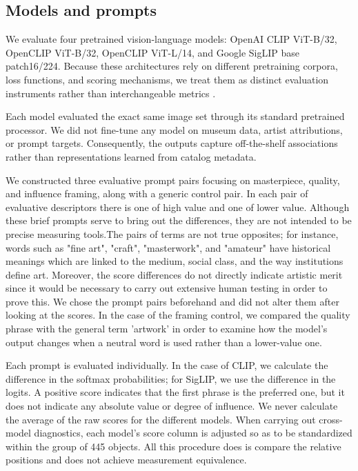 \documentclass[pdflatex,sn-basic,Numbered]{sn-jnl}
\begin{document}
\subsection{Models and prompts}

We evaluate four pretrained vision-language models: OpenAI CLIP ViT-B/32, OpenCLIP ViT-B/32, OpenCLIP ViT-L/14, and Google SigLIP base patch16/224. Because these architectures rely on different pretraining corpora, loss functions, and scoring mechanisms, we treat them as distinct evaluation instruments rather than interchangeable metrics \cite{radford2021learning, cherti2023reproducible, schuhmann2022laion, zhai2023sigmoid}.

Each model evaluated the exact same image set through its standard pretrained processor. We did not fine-tune any model on museum data, artist attributions, or prompt targets. Consequently, the outputs capture off-the-shelf associations rather than representations learned from catalog metadata.

We constructed three evaluative prompt pairs focusing on masterpiece, quality, and influence framing, along with a generic control pair.
In each pair of evaluative descriptors there is one of high value and one of lower value. Although these brief prompts serve to bring out the differences, they are not intended to be precise measuring tools.The pairs of terms are not true opposites; for instance, words such as "fine art", "craft", "masterwork", and "amateur" have historical meanings which are linked to the medium, social class, and the way institutions define art. Moreover, the score differences do not directly indicate artistic merit since it would be necessary to carry out extensive human testing in order to prove this. We chose the prompt pairs beforehand and did not alter them after looking at the scores. In the case of the framing control, we compared the quality phrase with the general term 'artwork' in order to examine how the model's output changes when a neutral word is used rather than a lower-value one.

Each prompt is evaluated individually. In the case of CLIP, we calculate the difference in the softmax probabilities; for SigLIP, we use the difference in the logits. A positive score indicates that the first phrase is the preferred one, but it does not indicate any absolute value or degree of influence. We never calculate the average of the raw scores for the different models. When carrying out cross-model diagnostics, each model's score column is adjusted so as to be standardized within the group of 445 objects. All this procedure does is compare the relative positions and does not achieve measurement equivalence.
\end{document}

